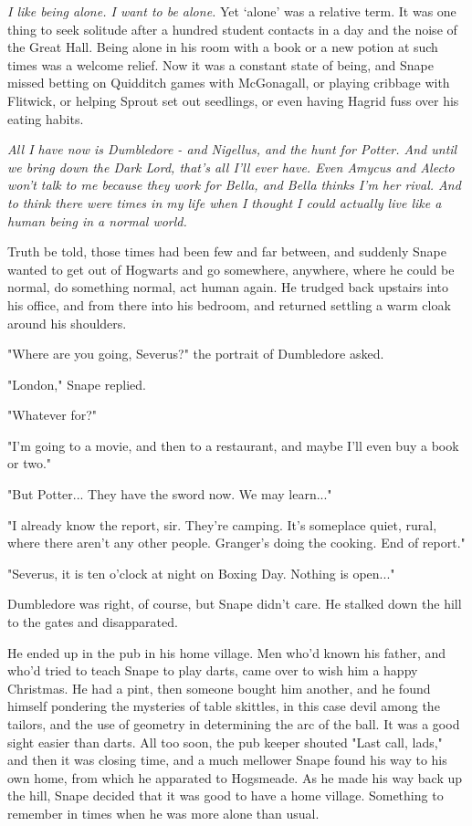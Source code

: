 \emph{I like being alone. I want to be alone.} Yet `alone' was a relative term. It was one thing to seek solitude after a hundred student contacts in a day and the noise of the Great Hall. Being alone in his room with a book or a new potion at such times was a welcome relief. Now it was a constant state of being, and Snape missed betting on Quidditch games with McGonagall, or playing cribbage with Flitwick, or helping Sprout set out seedlings, or even having Hagrid fuss over his eating habits.

\emph{All I have now is Dumbledore - and Nigellus, and the hunt for Potter. And until we bring down the Dark Lord, that's all I'll ever have. Even Amycus and Alecto won't talk to me because they work for Bella, and Bella thinks I'm her rival. And to think there were times in my life when I thought I could actually live like a human being in a normal world.}

Truth be told, those times had been few and far between, and suddenly Snape wanted to get out of Hogwarts and go somewhere, anywhere, where he could be normal, do something normal, act human again. He trudged back upstairs into his office, and from there into his bedroom, and returned settling a warm cloak around his shoulders.

"Where are you going, Severus?" the portrait of Dumbledore asked.

"London," Snape replied.

"Whatever for?"

"I'm going to a movie, and then to a restaurant, and maybe I'll even buy a book or two."

"But Potter... They have the sword now. We may learn..."

"I already know the report, sir. They're camping. It's someplace quiet, rural, where there aren't any other people. Granger's doing the cooking. End of report."

"Severus, it is ten o'clock at night on Boxing Day. Nothing is open..."

Dumbledore was right, of course, but Snape didn't care. He stalked down the hill to the gates and disapparated.

He ended up in the pub in his home village. Men who'd known his father, and who'd tried to teach Snape to play darts, came over to wish him a happy Christmas. He had a pint, then someone bought him another, and he found himself pondering the mysteries of table skittles, in this case devil among the tailors, and the use of geometry in determining the arc of the ball. It was a good sight easier than darts. All too soon, the pub keeper shouted "Last call, lads," and then it was closing time, and a much mellower Snape found his way to his own home, from which he apparated to Hogsmeade. As he made his way back up the hill, Snape decided that it was good to have a home village. Something to remember in times when he was more alone than usual.

